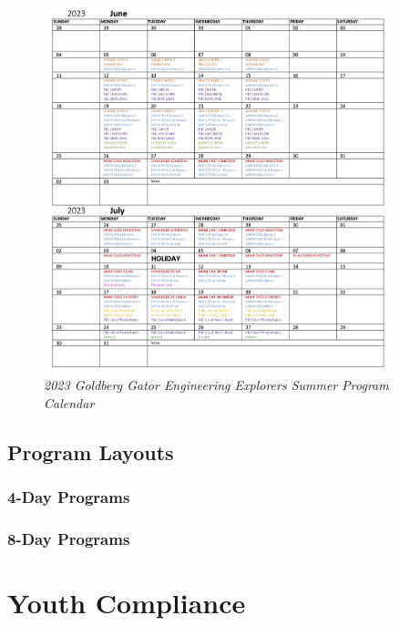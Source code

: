 \documentclass[
]{article}
\begin{document}
\begin{figure}
\centering
\includegraphics[width=0.9\textwidth,height=\textheight]{Images/GGEE_23_Calendar.jpg}
\caption{\emph{2023 Goldberg Gator Engineering Explorers Summer Program
Calendar}}
\end{figure}

\hypertarget{program-layouts}{%
\subsection{Program Layouts}\label{program-layouts}}

\hypertarget{day-programs}{%
\subsubsection{4-Day Programs}\label{day-programs}}

\hypertarget{day-programs-1}{%
\subsubsection{8-Day Programs}\label{day-programs-1}}

\hypertarget{youth-compliance}{%
\section{Youth Compliance}\label{youth-compliance}}
\end{document}
